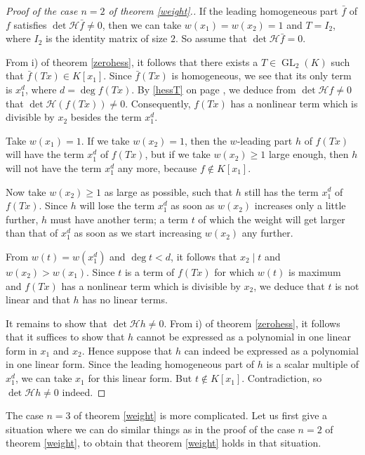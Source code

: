 \documentclass[10pt]{article}
\theoremstyle{remark}
\theoremstyle{definition}
\newcommand{\hess}{{\mathcal H}}
\newcommand{\GL}{\operatorname{GL}}
\begin{document}
\begin{proof}[Proof of the case $n=2$ of theorem \ref{weight}.]
If the leading homogeneous part $\bar{f}$ of $f$ satisfies $\det \hess \bar{f} \ne 0$,
then we can take $w(x_1) = w(x_2) = 1$ and $T = I_2$, where $I_2$ is the identity 
matrix of size $2$. So assume
that $\det \hess \bar{f} = 0$. 

From i) of theorem \ref{zerohess}, it follows that there
exists a $T \in \GL_2(K)$ such that $\bar{f}(Tx) \in K[x_1]$. Since $\bar{f}(Tx)$ is 
homogeneous, we see that its only term is $x_1^d$, where $d = \deg f(Tx)$. 
By \eqref{hessT} on page \pageref{hessT}, we deduce from $\det \hess f \ne 0$ that 
$\det \hess (f(Tx)) \ne 0$. Consequently, $f(Tx)$ has a nonlinear term 
which is divisible by $x_2$ besides the term $x_1^d$.

Take $w(x_1) = 1$. If we take $w(x_2) = 1$, then the $w$-leading part $h$ of 
$f(Tx)$ will have the term $x_1^d$ of $f(Tx)$, but if we take $w(x_2) \ge 1$ large
enough, then $h$ will not have the term $x_1^d$ any more, because $f \notin K[x_1]$.

Now take $w(x_2) \ge 1$ as large as possible, such that $h$ still has the term $x_1^d$ of $f(Tx)$. 
Since $h$ will lose the term $x_1^d$ as soon as $w(x_2)$ increases only a little further,
$h$ must have another term; a term $t$ of which the weight will get larger than that of 
$x_1^d$ as soon as we start increasing $w(x_2)$ any further. 

From $w(t) = w(x_1^d)$ and
$\deg t < d$, it follows that $x_2 \mid t$ and $w(x_2) > w(x_1)$. 
Since $t$ is a term of $f(Tx)$ for which $w(t)$ is maximum 
and $f(Tx)$ has a nonlinear term which is divisible by $x_2$, we deduce that $t$ is not linear 
and that $h$ has no linear terms.

It remains to show that $\det \hess h \ne 0$.
From i) of theorem \ref{zerohess}, it follows that it suffices to show that $h$ cannot
be expressed as a polynomial in one linear form in $x_1$ and $x_2$. Hence suppose that
$h$ can indeed be expressed as a polynomial in one linear form. Since the leading 
homogeneous part of $h$ is a scalar multiple of $x_1^d$, we can take $x_1$ for this linear form. 
But $t \notin K[x_1]$. Contradiction, so $\det \hess h \ne 0$ indeed.
\end{proof}

The case $n = 3$ of theorem \ref{weight} is more complicated. Let us first give a situation where
we can do similar things as in the proof of the case $n=2$ of theorem \ref{weight}, 
to obtain that theorem \ref{weight} holds in that situation.
\end{document}
